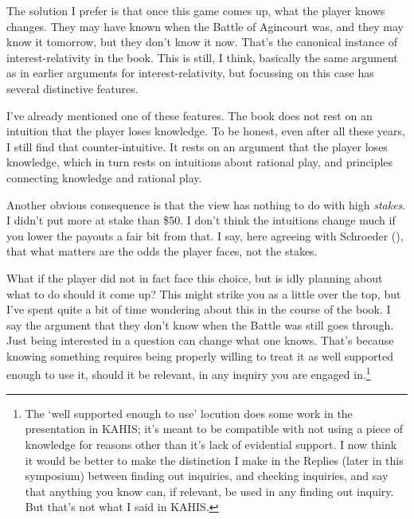 \documentclass[
  11pt,
  letterpaper,
  DIV=11,
  numbers=noendperiod,
  twoside]{scrartcl}
\begin{document}
The solution I prefer is that once this game comes up, what the player
knows changes. They may have known when the Battle of Agincourt was, and
they may know it tomorrow, but they don't know it now. That's the
canonical instance of interest-relativity in the book. This is still, I
think, basically the same argument as in earlier arguments for
interest-relativity, but focussing on this case has several distinctive
features.

I've already mentioned one of these features. The book does not rest on
an intuition that the player loses knowledge. To be honest, even after
all these years, I still find that counter-intuitive. It rests on an
argument that the player loses knowledge, which in turn rests on
intuitions about rational play, and principles connecting knowledge and
rational play.

Another obvious consequence is that the view has nothing to do with high
\emph{stakes}. I didn't put more at stake than \$50. I don't think the
intuitions change much if you lower the payouts a fair bit from that. I
say, here agreeing with Schroeder (),
that what matters are the odds the player faces, not the stakes.

What if the player did not in fact face this choice, but is idly
planning about what to do should it come up? This might strike you as a
little over the top, but I've spent quite a bit of time wondering about
this in the course of the book. I say the argument that they don't know
when the Battle was still goes through. Just being interested in a
question can change what one knows. That's because knowing something
requires being properly willing to treat it as well supported enough to
use it, should it be relevant, in any inquiry you are engaged
in.\footnote{The `well supported enough to use' locution does some work
  in the presentation in KAHIS; it's meant to be compatible with not
  using a piece of knowledge for reasons other than it's lack of
  evidential support. I now think it would be better to make the
  distinction I make in the Replies (later in this symposium) between
  finding out inquiries, and checking inquiries, and say that anything
  you know can, if relevant, be used in any finding out inquiry. But
  that's not what I said in KAHIS.}
\end{document}
